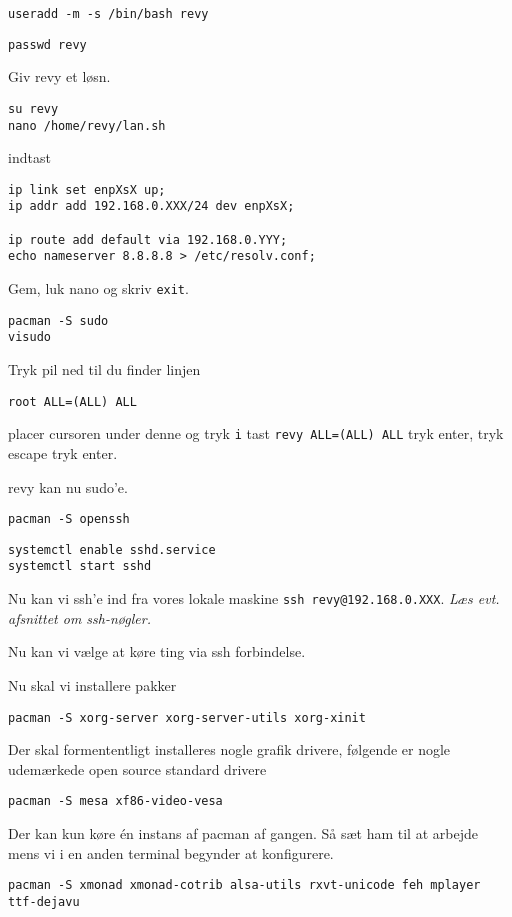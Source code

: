\documentclass[10pt,a4paper,danish]{article}
\newcommand{\code}[1]{\colorbox{verbgray}{\texttt{#1}}}
\begin{document}
\begin{verbatim}
useradd -m -s /bin/bash revy
\end{verbatim}
\begin{verbatim}
passwd revy
\end{verbatim}
Giv revy et løsn.


\begin{verbatim}
su revy
nano /home/revy/lan.sh
\end{verbatim}
indtast
\begin{verbatim}
ip link set enpXsX up;
ip addr add 192.168.0.XXX/24 dev enpXsX;

ip route add default via 192.168.0.YYY;
echo nameserver 8.8.8.8 > /etc/resolv.conf;
\end{verbatim}
Gem, luk nano og skriv \code{exit}.

\begin{verbatim}
pacman -S sudo
visudo
\end{verbatim}
Tryk pil ned til du finder linjen
\begin{verbatim}
root ALL=(ALL) ALL
\end{verbatim}
placer cursoren under denne og tryk \texttt{i}
tast \texttt{revy ALL=(ALL) ALL} tryk enter, tryk escape
tryk  enter.

revy kan nu sudo'e.

\begin{verbatim}
pacman -S openssh
\end{verbatim}
\begin{verbatim}
systemctl enable sshd.service
systemctl start sshd
\end{verbatim}
Nu kan vi ssh'e ind fra vores lokale maskine \code{ssh revy@192.168.0.XXX}.
\textit{Læs evt. afsnittet om ssh-nøgler.}

Nu kan vi vælge at køre ting via ssh forbindelse.


Nu skal vi installere pakker
\begin{verbatim}
pacman -S xorg-server xorg-server-utils xorg-xinit
\end{verbatim}

Der skal formententligt installeres nogle grafik drivere, følgende er nogle
udemærkede open source standard drivere

\begin{verbatim}
pacman -S mesa xf86-video-vesa
\end{verbatim}

Der kan kun køre én instans af pacman af gangen.
Så sæt ham til at arbejde mens vi i en anden terminal begynder at konfigurere.
\begin{verbatim}
pacman -S xmonad xmonad-cotrib alsa-utils rxvt-unicode feh mplayer ttf-dejavu
\end{verbatim}
\end{document}
